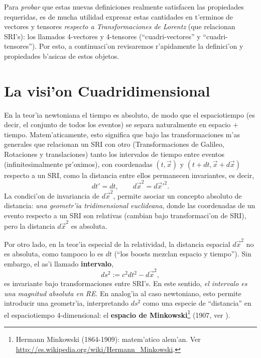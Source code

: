 Para \textit{probar} que estas nuevas definiciones realmente satisfacen las propiedades requeridas, es de mucha utilidad expresar estas cantidades en t'erminos de vectores y tensores \textit{respecto a Transformaciones de Lorentz} (que relacionan SRI's): los llamados 4-vectores y 4-tensores (``cuadri-vectores'' y ``cuadri-tensores''). Por esto, a continuaci'on revisaremos r'apidamente la definici'on y propiedades b'asicas de estos objetos.


\section{La visi'on Cuadridimensional}
En la teor'ia newtoniana el tiempo es absoluto, de modo que el espaciotiempo (es decir, el conjunto de todos los eventos) se separa naturalmente en espacio + tiempo. Matem'aticamente, esto significa que
bajo las transformaciones m'as generales que relacionan un SRI con otro
(Transformaciones de Galileo, Rotaciones y translaciones) tanto los intervalos de
tiempo entre eventos (infinitesimalmente pr'oximos), con coordenadas
$(t,\vec{x})$ y $(t+dt,\vec{x}+d\vec{x})$ respecto a un SRI, como la
distancia entre ellos permanecen invariantes, es decir,
\begin{equation}
dt'=dt, \qquad d\vec{x}^2=d\vec{x}'^2.
\end{equation}
La condici'on de invariancia de $d\vec{x}^2$, permite asociar un concepto
absoluto de distancia: \textit{una geometr'ia tridimensional euclideana}, donde las coordenadas de un evento respecto a un SRI son relativas (cambian bajo transformaci'on de SRI), pero la distancia $d\vec{x}^2$ es absoluta.

Por otro lado, en la teor'ia especial de la relatividad, la distancia espacial $d\vec{x}^2$ no es absoluta, como tampoco lo es $dt$ (``los boosts mezclan espacio y tiempo''). Sin embargo, el as'i llamado \textbf{intervalo},
\begin{equation}
ds^2:=c^2dt^2-d\vec{x}^2, \label{ds}
\end{equation}
es invariante bajo transformaciones entre SRI's. En este sentido, \textit{el
intervalo es una magnitud absoluta en RE}. En analog'ia al caso newtoniano, esto permite introducir una geometr'ia, interpretando $ds^2$ como una especie de ``distancia'' en el espaciotiempo 4-dimensional: el \textbf{espacio de Minkowski}\footnote{Hermann Minkowski (1864-1909): matem'atico alem'an. Ver \url{http://es.wikipedia.org/wiki/Hermann_Minkowski}.} (1907, ver \cite{Minkowski07}).

